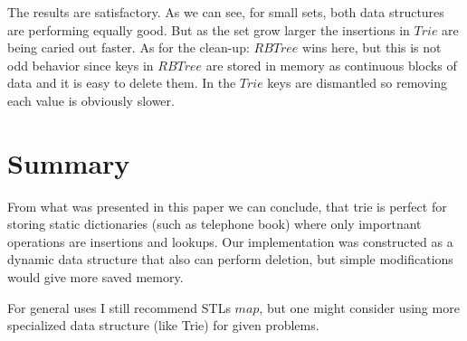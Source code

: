 \documentclass[a4paper,12pt]{article}
\begin{document}
The results are satisfactory. As we can see, for small sets, both data structures are performing equally good. But as the set grow larger the insertions in $Trie$ are being caried out faster. As for the clean-up: $RBTree$ wins here, but this is not odd behavior since keys in $RBTree$ are stored in memory as continuous blocks of data and it is easy to delete them. In the $Trie$ keys are dismantled so removing each value is obviously slower.

\section{Summary}

From what was presented in this paper we can conclude, that trie is perfect for storing static dictionaries (such as telephone book) where only importnant operations are insertions and lookups. Our implementation was constructed as a dynamic data structure that also can perform deletion, but simple modifications would give more saved memory.

For general uses I still recommend STLs $map$, but one might consider using more specialized data structure (like Trie) for given problems.
\end{document}
